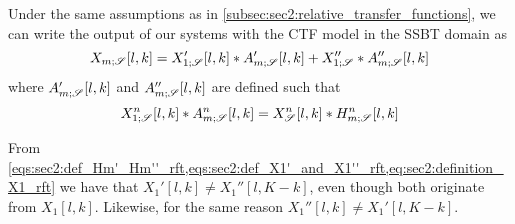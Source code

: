 Under the same assumptions as in \cref{subsec:sec2:relative_transfer_functions}, we can write the output of our systems with the CTF model in the SSBT domain as
\begin{equation}
	\label{eq:sec2:system_ctf_ssbt_output}
	X_{m;\mathscr{S}}[l,k] = X_{1;\mathscr{S}}'[l,k] \ast A_{m;\mathscr{S}}'[l,k] + X_{1;\mathscr{S}}'' \ast A_{m;\mathscr{S}}''[l,k]
\end{equation}
where $A_{m;\mathscr{S}}'[l,k]$ and $A_{m;\mathscr{S}}''[l,k]$ are defined such that
\begin{equation}
	X_{1;\mathscr{S}}^n[l,k] \ast A_{m;\mathscr{S}}^n[l,k] = X_{\mathscr{S}}^n[l,k] \ast H_{m;\mathscr{S}}^n[l,k]
\end{equation}

From \cref{eqs:sec2:def_Hm'_Hm''_rft,eqs:sec2:def_X1'_and_X1''_rft,eq:sec2:definition_X1_rft} we have that $X_{1}'[l,k] \neq X_{1}''[l,K-k]$, even though both originate from $X_{1}[l,k]$. Likewise, for the same reason $X_{1}''[l,k] \neq X_{1}'[l,K-k]$.